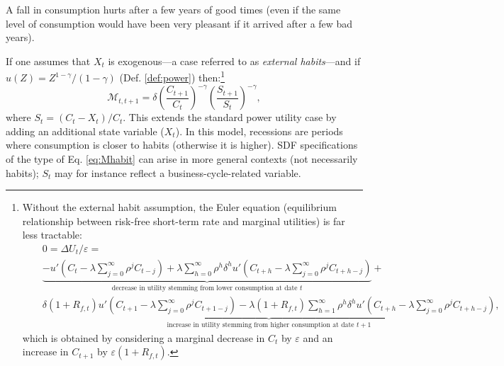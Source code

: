 \documentclass[
  12pt,
]{book}
\theoremstyle{definition}
\theoremstyle{definition}
\theoremstyle{definition}
\theoremstyle{definition}
\theoremstyle{remark}
\begin{document}
A fall in consumption hurts after a few years of good times (even if the same level of consumption would have been very pleasant if it arrived after a few bad years).

If one assumes that \(X_t\) is exogenous---a case referred to as \emph{external habits}---and if \(u(Z)=Z^{1-\gamma}/(1-\gamma)\) (Def. \ref{def:power}) then:\footnote{Without the external habit assumption, the Euler equation (equilibrium relationship between risk-free short-term rate and marginal utilities) is far less tractable:
  \begin{eqnarray*}
  && 0 = \Delta U_t / \varepsilon =\\
  && \underbrace{ - u'\left(C_{t} - \lambda \sum_{j=0}^\infty \rho^j C_{t-j}\right) + \lambda  \sum_{h=0}^{\infty} \rho^h \delta^{h}u'\left(C_{t+h} - \lambda \sum_{j=0}^\infty \rho^j C_{t+h-j}\right)}_{\mbox{decrease in utility stemming from lower consumption at date $t$}} +\\
  && \underbrace{\delta(1+R_{f,t}) u'\left(C_{t+1} - \lambda \sum_{j=0}^\infty \rho^j C_{t+1-j}\right) - \lambda (1+R_{f,t}) \sum_{h=1}^{\infty} \rho^h \delta^{h}u'\left(C_{t+h} - \lambda \sum_{j=0}^\infty \rho^j C_{t+h-j}\right)}_{\mbox{increase in utility stemming from higher consumption at date $t+1$}},
  \end{eqnarray*}
  which is obtained by considering a marginal decrease in \(C_t\) by \(\varepsilon\) and an increase in \(C_{t+1}\) by \(\varepsilon(1+R_{f,t})\).}
\begin{equation}
\mathcal{M}_{t,t+1} = \delta \left( \frac{C_{t+1}}{C_t} \right)^{-\gamma}\left( \frac{S_{t+1}}{S_t} \right)^{-\gamma},\label{eq:Mhabit}
\end{equation}
where \(S_t = (C_t - X_t)/C_t\). This extends the standard power utility case by adding an additional state variable (\(X_t\)). In this model, recessions are periods where consumption is closer to habits (otherwise it is higher). SDF specifications of the type of Eq. \eqref{eq:Mhabit} can arise in more general contexts (not necessarily habits); \(S_t\) may for instance reflect a business-cycle-related variable.
\end{document}
